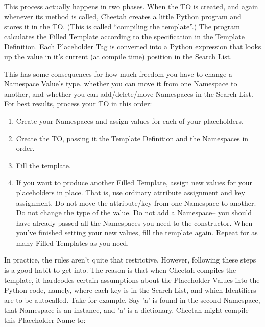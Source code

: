 This process actually happens in two phases.  When the TO is created, and again
whenever its  method is called, Cheetah creates a little
Python program and stores it in the TO.  (This is called ``compiling the 
template''.)  The program calculates the Filled Template according to the
specification in the Template Definition.  Each Placeholder Tag is converted
into a Python expression that looks up the value in it's current (at compile
time) position in the Search List.

This has some consequences for how much freedom you have to change a 
Namespace Value's type, whether you can move it from one Namespace to 
another, and whether you can add/delete/move Namespaces in the Search List.
For best results, process your TO in this order:

\begin{enumerate}

\item   Create your Namespaces and assign values for each of your placeholders.

\item   Create the TO, passing it the Template Definition and the Namespaces in
     order.

\item   Fill the template.

\item  If you want to produce another Filled Template, assign new values for
     your placeholders in place.  That is, use ordinary attribute assignment and
     key assignment.  Do not move the attribute/key from one Namespace to 
     another.  Do not change the type of the value.  Do not add a Namespace--
     you should have already passed all the Namespaces you need to the
     constructor.  When you've finished setting your new values, fill the
     template again.  Repeat for as many Filled Templates as you need.

\end{enumerate}

In practice, the rules aren't quite that restrictive.  However, following these
steps is a good habit to get into.  The reason is that when Cheetah compiles
the template, it hardcodes certain assumptions about the Placeholder Values into
the Python code, namely, where each key is in the Search List, and which 
Identifiers are to be autocalled.  Take  for example.  Say 'a'
is found in the second Namespace, that Namespace is an instance, and 'a' is a
dictionary.  Cheetah might compile this Placeholder Name to:

